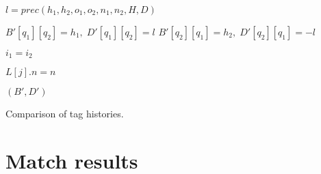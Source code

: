 \documentclass[AMA,STIX1COL]{WileyNJD-v2}
\begin{document}
\begin{algorithm}[]
\begin{multicols}{2}
{{{{{                        \BlankLine
                        $l = prec (h_1, h_2, o_1, o_2, n_1, n_2, H, D)$ \;
                    }

                    \BlankLine
                    $B'[q_1][q_2] = h_1, \; D'[q_1][q_2] = l$ \;
                    $B'[q_2][q_1] = h_2, \; D'[q_2][q_1] = -l$ \;
                }

                $i_1 = i_2$ \;
            }

            \BlankLine
             {
                $L[j].n = n$
            }
        }

        \BlankLine
        \Return $(B', D')$ \;
    }

\end{multicols}
\vspace{1em}
\caption{Comparison of tag histories.}
\end{algorithm}
\medskip


\section{Match results}\label{section_results}
\end{document}
